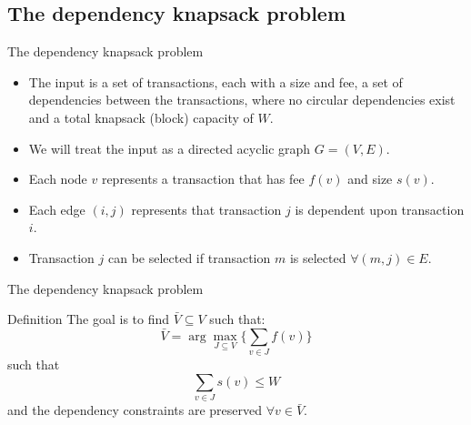 \documentclass{beamer}
\begin{document}
\subsection*{The dependency knapsack problem}

\begin{frame}{The dependency knapsack problem} %
    \begin{itemize}
        \item  {The input is a set of transactions, each with a size and 
        fee, a set of dependencies between the transactions, where no 
        circular dependencies exist and a total knapsack (block) capacity 
        of $W$.}
        \item {We will treat the input as a directed acyclic graph 
        $ G = (V,E)$.}
        \item {Each node $v$ represents a transaction that has fee $f(v)$ 
        and size $s(v)$.}
        \item { Each edge $(i,j)$ represents that transaction $j$ is 
        dependent upon transaction $i$.}
        \item {Transaction $j$ can be selected if transaction $m$ is 
        selected $\forall (m,j)\in E$.}
    \end{itemize}
\end{frame}

\begin {frame}{The dependency knapsack problem} %
    \begin{block}{Definition}
    The goal is to find $\bar V \subseteq V$ such that: \\
    $$ \bar V = \arg \max_{J\subseteq V} \{\sum_{v\in J} f(v)\}$$ such 
    that \\
    $$ \sum_{v \in J} s(v) \leq W $$
    and the dependency constraints are preserved $\forall v \in \bar V$.
    \end{block}
\end{frame}
\end{document}
